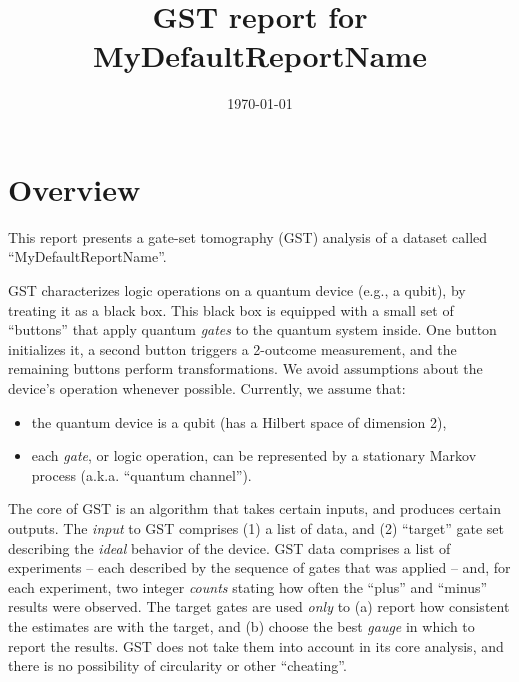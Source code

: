 \documentclass{article}[11pt]
\begin{document}
\title{GST report for MyDefaultReportName}
\date{\vspace{-1cm}\today}

\begingroup
\let\center\flushleft
\let\endcenter\endflushleft
\maketitle
\endgroup

\section{Overview}
This report presents a gate-set tomography (GST) analysis of a dataset called ``MyDefaultReportName''.  

GST characterizes logic operations on a quantum device (e.g., a qubit), by treating it as a black box.  This black box is equipped with a small set of ``buttons'' that apply quantum \emph{gates} to the quantum system inside.  One button initializes it, a second button triggers a 2-outcome measurement, and the remaining buttons perform transformations.  We avoid assumptions about the device's operation whenever possible.  Currently, we assume that:
\begin{itemize}
\item the quantum device is a qubit (has a Hilbert space of dimension 2),
\item each \emph{gate}, or logic operation, can be represented by a stationary Markov process (a.k.a. ``quantum channel'').
\end{itemize}
The core of GST is an algorithm that takes certain inputs, and produces certain outputs.  The \emph{input} to GST comprises (1) a list of data, and (2) ``target'' gate set describing the \emph{ideal} behavior of the device.  GST data comprises a list of experiments -- each described by the sequence of gates that was applied -- and, for each experiment, two integer \emph{counts} stating how often the ``plus'' and ``minus'' results were observed.  The target gates are used \emph{only} to (a) report how consistent the estimates are with the target, and (b) choose the best \emph{gauge} in which to report the results.  GST does not take them into account in its core analysis, and there is no possibility of circularity or other ``cheating''.
\end{document}
